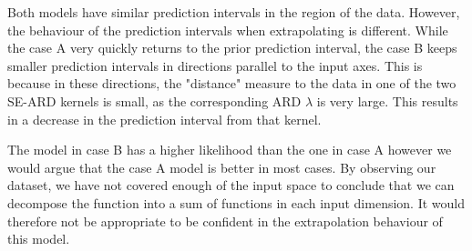 \documentclass[11pt]{article}
\begin{document}
Both models have similar prediction intervals in the region of the data. However, the behaviour of the prediction intervals when extrapolating is different. While the case A very quickly returns to the prior prediction interval, the case B keeps smaller prediction intervals in directions parallel to the input axes. This is because in these directions, the "distance" measure to the data in one of the two SE-ARD kernels is small, as the corresponding ARD $\lambda$ is very large. This results in a decrease in the prediction interval from that kernel. 

The model in case B has a higher likelihood than the one in case A however we would argue that the case A model is better in most cases. By observing our dataset, we have not covered enough of the input space to conclude that we can decompose the function into a sum of functions in each input dimension. It would therefore not be appropriate to be confident in the extrapolation behaviour of this model.
\end{document}
